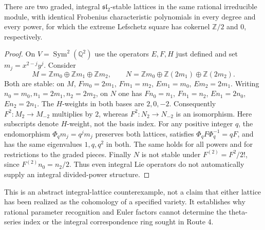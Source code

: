 \begin{proposition}
There are two graded, integral $\mathfrak{sl}_2$-stable lattices
in the same rational irreducible module, with identical
Frobenius characteristic polynomials in every degree and every
power, for which the extreme Lefschetz square has cokernel
$\mathbb Z/2$ and $0$, respectively.
\end{proposition}
\begin{proof}
On $V=\operatorname{Sym}^2(\mathbb Q^2)$ use the operators
$E,F,H$ just defined and set $m_j=x^{2-j}y^j$. Consider
\[
 M=\mathbb Zm_0\oplus\mathbb Zm_1\oplus\mathbb Zm_2,
 \qquad
 N=\mathbb Zm_0\oplus\mathbb Z(2m_1)\oplus\mathbb Z(2m_2).
\]
Both are stable: on $M$,
$Fm_0=2m_1$, $Fm_1=m_2$,
$Em_1=m_0$, $Em_2=2m_1$.
Writing $n_0=m_0,n_1=2m_1,n_2=2m_2$, on $N$ one has
$Fn_0=n_1$, $Fn_1=n_2$,
$En_1=2n_0$, $En_2=2n_1$.
The $H$-weights in both bases are $2,0,-2$.
Consequently $F^2:M_2\to M_{-2}$ multiplies by $2$,
whereas $F^2:N_2\to N_{-2}$ is an isomorphism.
Here subscripts denote $H$-weight, not the basis index.
For any positive integer $q$, the endomorphism
$\Phi_qm_j=q^jm_j$ preserves both lattices, satisfies
$\Phi_qF\Phi_q^{-1}=qF$, and has the same eigenvalues
$1,q,q^2$ in both. The same holds for all powers and for
restrictions to the graded pieces. Finally $N$ is not stable
under $F^{(2)}=F^2/2!$, since $F^{(2)}n_0=n_2/2$.
Thus even integral Lie operators do not automatically supply
an integral divided-power structure.
\end{proof}

This is an abstract integral-lattice counterexample, not a claim
that either lattice has been realized as the cohomology of a
specified variety. It establishes why rational parameter
recognition and Euler factors cannot determine the theta-series
index or the integral correspondence ring sought in Route 4.

